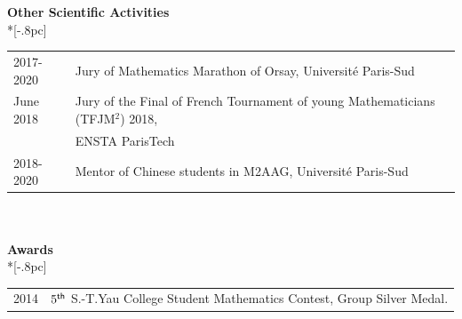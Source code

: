 \documentclass[12pt]{article}
\begin{document}
\vspace{0.3cm}

{\large \bf Other Scientific Activities} \\*[-.8pc]
\underline{\hspace{6in}} \\
\begin{tabular}{ll}
2017-2020 & Jury of Mathematics Marathon of Orsay, Universit\'{e} Paris-Sud\\
June 2018 & Jury of the Final of French Tournament of young Mathematicians (TFJM$^2$) 2018,\\
&  ENSTA ParisTech\\
2018-2020 & Mentor of Chinese students in M2AAG, Universit\'{e} Paris-Sud
\end{tabular}
\\
\\
{\large \bf Awards} \\*[-.8pc]
\underline{\hspace{6.6in}} \\
\begin{tabular}{ll}
2014 &  $5^{\sf th}$ S.-T.Yau College Student Mathematics Contest, Group Silver Medal.
\end{tabular}
\\


\end{document}
